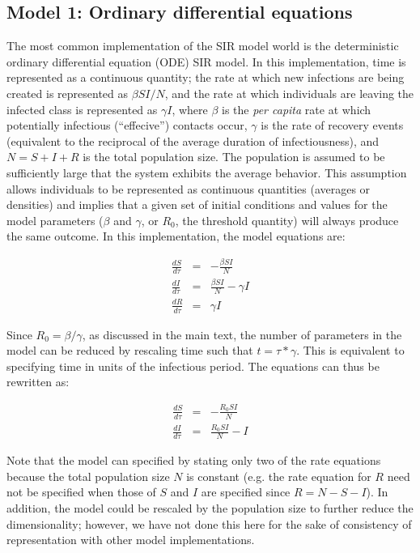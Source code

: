 \documentclass[margin,line,11pt]{article}
\begin{document}
\subsection{Model 1: Ordinary differential equations}

The most common implementation of the SIR model world is the deterministic ordinary differential equation (ODE) SIR model. 
In this implementation, time is represented as a continuous quantity; the rate at which new infections are being created is represented as $\beta S I / N$, and the rate at which individuals are leaving the infected class is represented as $\gamma I$, where $\beta$ is the {\em per capita} rate at which potentially infectious (``effecive'') contacts occur, $\gamma$ is the rate of recovery events (equivalent to the reciprocal of the average duration of infectiousness), and $N=S+I+R$ is the total population size. 
The population is assumed to be sufficiently large that the system exhibits the average behavior. 
This assumption allows individuals to be represented as continuous quantities (averages or densities) and implies that a given set of initial conditions and values for the model parameters ($\beta$ and $\gamma$, or $R_0$, the threshold quantity) will always produce the same outcome. 
In this implementation, the model equations are:

\begin{eqnarray*}
\frac{dS}{d\tau} &=& -\frac{\beta S I}{N}\\
\frac{dI}{d\tau} &=& \frac{\beta S I}{N} - \gamma I \\
\frac{dR}{d\tau} &=& \gamma I
\end{eqnarray*}

\noindent Since $R_0 = \beta / \gamma$, as discussed in the main text, the number of parameters in the model can be reduced by rescaling time such that $t = \tau * \gamma$. 
This is equivalent to specifying time in units of the infectious period. The equations can thus be rewritten as:

\begin{eqnarray}
\frac{dS}{d\tau} &=& -\frac{R_0 S I}{N}\label{eqn:1} \\
\frac{dI}{d\tau} &=& \frac{R_0 S I}{N} - I\label{eqn:2}
\end{eqnarray}

\noindent Note that the model can specified by stating only two of the rate equations because the total population size $N$ is constant (e.g. the rate equation for $R$ need not be specified when those of $S$ and $I$ are specified since $R=N-S-I$). In addition, the model could be rescaled by the population size to further reduce the dimensionality; however, we have not done this here for the sake of consistency of representation with other model implementations.
\end{document}
